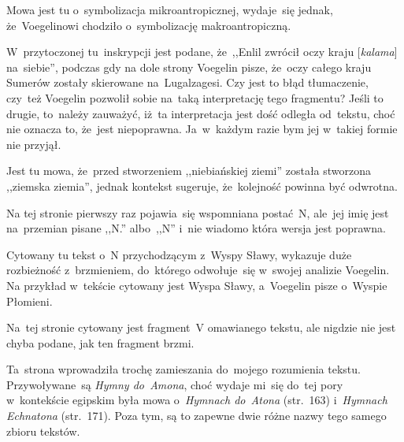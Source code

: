 \documentclass[a4paper,11pt]{article}
\begin{document}
\noi {}

\vspace{\spaceFour}

\start {} Mowa jest tu o~symbolizacja mikroantropicznej,
wydaje~się jednak, że~Voegelinowi chodziło o~symbolizację
makroantropiczną.

\vspace{\spaceFour}


\start {} W~przytoczonej tu~inskrypcji jest podane, że~,,Enlil
zwrócił oczy kraju [\emph{kalama}] na~siebie'', podczas gdy na dole
strony Voegelin pisze, że~oczy całego kraju Sumerów zostały skierowane
na~Lugalzagesi. Czy jest to błąd tłumaczenie, czy~też Voegelin
pozwolił sobie na~taką interpretację tego fragmentu? Jeśli to drugie,
to~należy zauważyć, iż~ta interpretacja jest dość odległa od~tekstu,
choć nie oznacza to, że~jest niepoprawna. Ja~w~każdym razie bym jej
w~takiej formie nie przyjął.

\vspace{\spaceFour}


\start {} Jest tu mowa, że~przed stworzeniem ,,niebiańskiej
ziemi'' została stworzona ,,ziemska ziemia'', jednak kontekst
sugeruje, że~kolejność powinna być odwrotna.

\vspace{\spaceFour}


\start {} Na tej stronie pierwszy raz pojawia~się wspomniana
postać~N, ale~jej imię jest na~przemian pisane ,,N.'' albo~,,N'' i~nie
wiadomo która wersja jest poprawna.

\vspace{\spaceFour}


\start {} Cytowany tu tekst o~N przychodzącym z~Wyspy Sławy,
wykazuje duże rozbieżność z~brzmieniem, do~którego odwołuje~się
w~swojej analizie Voegelin. Na przykład w~tekście cytowany jest Wyspa
Sławy, a~Voegelin pisze o~Wyspie Płomieni.

\vspace{\spaceFour}


\start {} Na~tej stronie cytowany jest fragment~V omawianego
tekstu, ale nigdzie nie jest chyba podane, jak ten fragment brzmi.

\vspace{\spaceFour}


\start {} Ta~strona wprowadziła trochę zamieszania do~mojego
rozumienia tekstu. Przywoływane~są \emph{Hymny do~Amona}, choć wydaje
mi~się do~tej pory w~kontekście egipskim była mowa o~\emph{Hymnach
  do~Atona} (str.~163) i~\emph{Hymnach Echnatona} (str.~171). Poza
tym, są to zapewne dwie różne nazwy tego samego zbioru tekstów.
\end{document}
